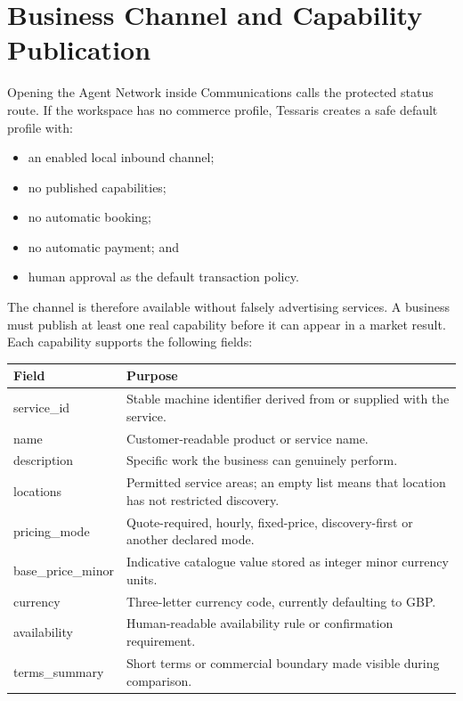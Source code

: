 \documentclass[11pt,a4paper]{article}
\begin{document}
\section{Business Channel and Capability Publication}

Opening the Agent Network inside Communications calls the protected status
route.  If the workspace has no commerce profile, Tessaris creates a safe
default profile with:

\begin{itemize}
  \item an enabled local inbound channel;
  \item no published capabilities;
  \item no automatic booking;
  \item no automatic payment; and
  \item human approval as the default transaction policy.
\end{itemize}

The channel is therefore available without falsely advertising services.  A
business must publish at least one real capability before it can appear in a
market result.  Each capability supports the following fields:

\begin{longtable}{>{\ttfamily}p{38mm}p{98mm}}
\toprule
Field & Purpose \\
\midrule
\endhead
service\_id & Stable machine identifier derived from or supplied with the service. \\
name & Customer-readable product or service name. \\
description & Specific work the business can genuinely perform. \\
locations & Permitted service areas; an empty list means that location has not restricted discovery. \\
pricing\_mode & Quote-required, hourly, fixed-price, discovery-first or another declared mode. \\
base\_price\_minor & Indicative catalogue value stored as integer minor currency units. \\
currency & Three-letter currency code, currently defaulting to GBP. \\
availability & Human-readable availability rule or confirmation requirement. \\
terms\_summary & Short terms or commercial boundary made visible during comparison. \\
\bottomrule
\end{longtable}
\end{document}
